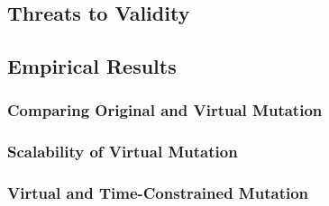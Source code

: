 \subsection{Threats to Validity}

\subsection{Empirical Results}


\subsubsection{Comparing Original and Virtual Mutation}
\label{sec:empirical-study-RQ-original-virtual-time}



\subsubsection{Scalability of Virtual Mutation}
\label{sec:empirical-study-RQ-mutants-tests}



\subsubsection{Virtual and Time-Constrained Mutation}
\label{sec:empirical-study-RQ-virtual-time-constrained-virtual}


